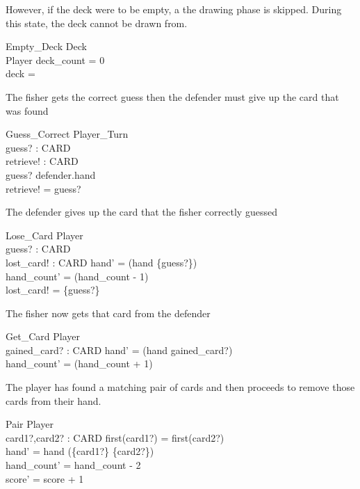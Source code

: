 However, if the deck were to be empty, a the drawing phase is skipped.
During this state, the deck cannot be drawn from.
\begin{schema}{Empty\_Deck}
    \Xi Deck \\
    \Xi Player
    \where
    deck\_count = 0 \\
    deck = \emptyset
\end{schema}

The fisher gets the correct guess then the defender must
give up the card that was found
\begin{schema}{Guess\_Correct}
    \Xi Player\_Turn \\
    guess? : CARD \\
    retrieve! : CARD\\
    \where
    guess? \in defender.hand \\
    retrieve! = guess?
\end{schema}

The defender gives up the card that the fisher correctly guessed
\begin{schema}{Lose\_Card}
    \Delta Player \\
    guess? : CARD \\
    lost\_card! : \power CARD
    \where
    hand' = (hand \setminus \{guess?\}) \\
    hand\_count' = (hand\_count - 1) \\
    lost\_card! = \{guess?\}
\end{schema}

The fisher now gets that card from the defender
\begin{schema}{Get\_Card}
    \Delta Player \\
    gained\_card? : \power CARD
    \where
    hand' = (hand \cup gained\_card?) \\
    hand\_count' = (hand\_count + 1)
\end{schema}

The player has found a matching pair of cards and then proceeds
to remove those cards from their hand.
\begin{schema}{Pair}
    \Delta Player \\
    card1?,card2? : CARD
    \where
    first(card1?) = first(card2?) \\
    hand' = hand \setminus (\{card1?\} \cup \{card2?\}) \\ 
    hand\_count' = hand\_count - 2 \\
    score' = score + 1
\end{schema}

